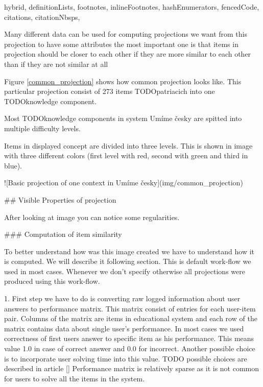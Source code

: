 \documentclass[
  digital, %
  table,   %
  nolof,     %
  nolot,     %
  nocover
]{fithesis3}
\begin{document}
\begin{markdown*}{%
  hybrid,
  definitionLists,
  footnotes,
  inlineFootnotes,
  hashEnumerators,
  fencedCode,
  citations,
  citationNbsps,
}

Many different data can be used for computing projections
we want from this projection to have some attributes
the most important one is that items in projection should be closer to each other if they are more similar to each other than if they are not similar at all


Figure \ref{common_projection} shows how common projection looks like. This particular projection consist of 273 items TODOpatriacich into one TODOknowledge component.

Most TODOknowledge components in system Umíme česky are spitted into multiple difficulty levels.

Items in displayed concept are divided into three levels. This is shown in image with three different colors (first level with red, second with green and third in blue).

![Basic projection of one context in Umíme česky\label{common_projection}](img/common_projection)

## Visible Properties of projection




After looking at image you can notice some regularities.

### Computation of item similarity

To better understand how was this image created we have to understand how it is computed. We will describe it following section. This is default work-flow we used in most cases. Whenever we don't specify otherwise all projections were produced using this work-flow.


1. First step we have to do is converting raw logged information about user answers to performance matrix. This matrix consist of entries for each user-item pair. Columns of the matrix are items in educational system and each row of the matrix contains data about single user's performance. In most cases we used correctness of first users answer to specific item as his performance. This means value 1.0 in case of correct answer and 0.0 for incorrect. Another possible choice is to incorporate user solving time into this value. TODO possible choices are described in article [] Performance matrix is relatively sparse as it is not common for users to solve all the items in the system.


\end{markdown*}
\end{document}
